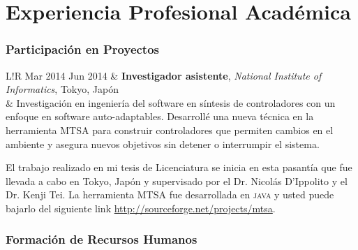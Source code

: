 \documentclass[10pt]{article}
\newcommand\VRule{\color{lightgray}\vrule width 0.5pt}
\begin{document}

\section*{Experiencia Profesional Académica}

\subsubsection*{Participación en Proyectos}

\begin{tabular}{L!{\VRule}R}
Mar 2014 Jun 2014 & \textbf{Investigador asistente}, \textit{National Institute of Informatics}, Tokyo, Japón\\
& \vspace{-0.7cm} Investigación en ingeniería del software en síntesis de controladores con un enfoque en software auto-adaptables.
Desarrollé una nueva técnica en la herramienta MTSA para construir controladores que permiten cambios en el ambiente y
asegura nuevos objetivos sin detener o interrumpir el sistema.

El trabajo realizado en mi tesis de Licenciatura se inicia en esta pasantía que fue llevada a cabo en Tokyo, Japón y
supervisado por el Dr. Nicolás D'Ippolito y el Dr. Kenji Tei. La herramienta MTSA fue desarrollada en \textsc{java} y
usted puede bajarlo del siguiente link \url{http://sourceforge.net/projects/mtsa}.\\
\end{tabular}

\subsubsection*{Formación de Recursos Humanos}
\end{document}
